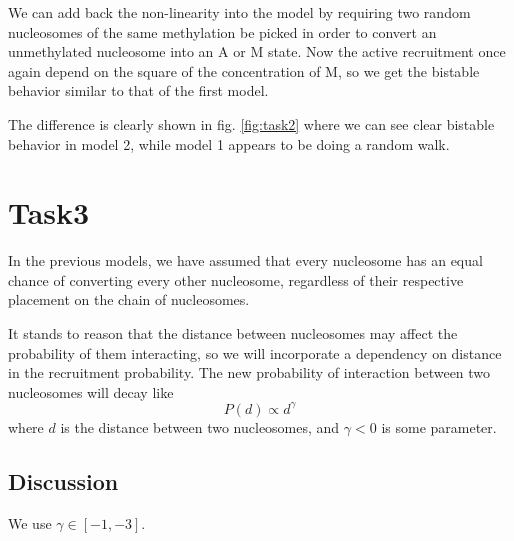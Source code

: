 \documentclass{article}
\begin{document}
We can add back the non-linearity into the model by requiring two random nucleosomes of the same methylation be picked in order to convert an unmethylated nucleosome into an A or M state. Now the active recruitment once again depend on the square of the concentration of M, so we get the bistable behavior similar to that of the first model. 

The difference is clearly shown in fig. \eqref{fig:task2} where we can see clear bistable behavior in model 2, while model 1 appears to be doing a random walk. 


\section{Task3}
In the previous models, we have assumed that every nucleosome has an equal chance of converting every other nucleosome, regardless of their respective placement on the chain of nucleosomes. 

It stands to reason that the distance between nucleosomes may affect the probability of them interacting, so we will incorporate a dependency on distance in the recruitment probability. The new probability of interaction between two nucleosomes will decay like 
\begin{equation}
	P(d) \propto d^\gamma
\end{equation}
where $d$ is the distance between two nucleosomes, and $\gamma <0$ is some parameter. 
\subsection{Discussion}
We use $\gamma\in [-1,-3]$. 
\end{document}
